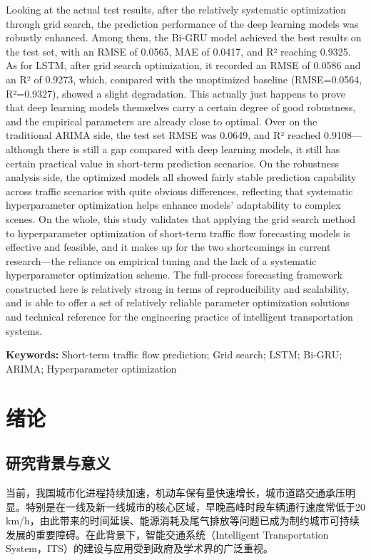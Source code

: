 \documentclass[12pt,a4paper,oneside]{ctexbook}
\begin{document}
	Looking at the actual test results, after the relatively systematic optimization through grid search, the prediction performance of the deep learning models was robustly enhanced. Among them, the Bi-GRU model achieved the best results on the test set, with an RMSE of 0.0565, MAE of 0.0417, and R² reaching 0.9325. As for LSTM, after grid search optimization, it recorded an RMSE of 0.0586 and an R² of 0.9273, which, compared with the unoptimized baseline (RMSE=0.0564, R²=0.9327), showed a slight degradation. This actually just happens to prove that deep learning models themselves carry a certain degree of good robustness, and the empirical parameters are already close to optimal. Over on the traditional ARIMA side, the test set RMSE was 0.0649, and R² reached 0.9108—although there is still a gap compared with deep learning models, it still has certain practical value in short-term prediction scenarios. On the robustness analysis side, the optimized models all showed fairly stable prediction capability across traffic scenarios with quite obvious differences, reflecting that systematic hyperparameter optimization helps enhance models' adaptability to complex scenes. On the whole, this study validates that applying the grid search method to hyperparameter optimization of short-term traffic flow forecasting models is effective and feasible, and it makes up for the two shortcomings in current research—the reliance on empirical tuning and the lack of a systematic hyperparameter optimization scheme. The full-process forecasting framework constructed here is relatively strong in terms of reproducibility and scalability, and is able to offer a set of relatively reliable parameter optimization solutions and technical reference for the engineering practice of intelligent transportation systems.
	
	\noindent\textbf{Keywords:} Short-term traffic flow prediction; Grid search; LSTM; Bi-GRU; ARIMA; Hyperparameter optimization
	
	\tableofcontents
	\clearpage
	
	\chapter{绪论}
	
	\section{研究背景与意义}
	当前，我国城市化进程持续加速，机动车保有量快速增长，城市道路交通承压明显。特别是在一线及新一线城市的核心区域，早晚高峰时段车辆通行速度常低于20 km/h，由此带来的时间延误、能源消耗及尾气排放等问题已成为制约城市可持续发展的重要障碍。在此背景下，智能交通系统（Intelligent Transportation System，ITS）的建设与应用受到政府及学术界的广泛重视。
	
\end{document}
